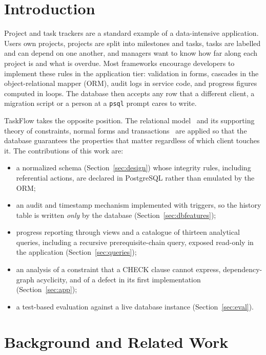 \documentclass[conference]{IEEEtran}
\begin{document}
\section{Introduction}

Project and task trackers are a standard example of a data-intensive
application. Users own projects, projects are split into milestones and tasks,
tasks are labelled and can depend on one another, and managers want to know how
far along each project is and what is overdue. Most frameworks encourage
developers to implement these rules in the application tier: validation in
forms, cascades in the object-relational mapper (ORM), audit logs in service
code, and progress figures computed in loops. The database then accepts any row
that a different client, a migration script or a person at a \texttt{psql}
prompt cares to write.

TaskFlow takes the opposite position. The relational model~\cite{codd1970}
and its supporting theory of constraints, normal forms and
transactions~\cite{silberschatz2019,elmasri2016} are applied so that the
database guarantees the properties that matter regardless of which client
touches it. The contributions of this work are:
\begin{itemize}
  \item a normalized schema (Section~\ref{sec:design}) whose integrity rules,
        including referential actions, are declared in PostgreSQL rather than
        emulated by the ORM;
  \item an audit and timestamp mechanism implemented with triggers, so the
        history table is written \emph{only} by the database
        (Section~\ref{sec:dbfeatures});
  \item progress reporting through views and a catalogue of thirteen analytical
        queries, including a recursive prerequisite-chain query, exposed
        read-only in the application (Section~\ref{sec:queries});
  \item an analysis of a constraint that a CHECK clause cannot express,
        dependency-graph acyclicity, and of a defect in its first implementation
        (Section~\ref{sec:app});
  \item a test-based evaluation against a live database instance
        (Section~\ref{sec:eval}).
\end{itemize}

\section{Background and Related Work}
\end{document}
